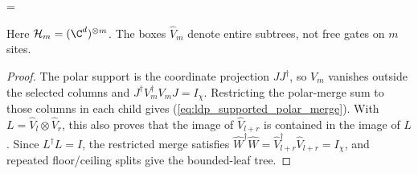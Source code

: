 \begin{lemma}
    \begin{center}
        \tenkzkernel
        \begin{tenkzequation}
            \begin{tenkz}[rows={wire}, cols=1, bonds=none]
            \end{tenkz}
            =
            \begin{tenkz}[rows={wire,wire}, cols=3, bonds=none]
            \end{tenkz}
        \end{tenkzequation}
    \end{center}
    Here $\mathcal H_m=(\C^d)^{\otimes m}$.
    The boxes $\widehat V_m$ denote entire subtrees, not free gates on $m$ sites.
\end{lemma}
\begin{proof}
    \leanok
    The polar support is the coordinate projection $JJ^\dagger$,
    so $V_m$ vanishes outside the selected columns and
    $J^\dagger V_m^\dagger V_mJ=I_\chi$.
    Restricting the polar-merge sum to those columns in each child gives
    (\ref{eq:ldp_supported_polar_merge}). With
    $L=\widehat V_l\otimes\widehat V_r$, this also proves that the
    image of $\widehat V_{l+r}$ is contained in the image of $L$.
    Since $L^\dagger L=I$, the restricted merge satisfies
    $\widehat W^\dagger\widehat W
        =\widehat V_{l+r}^\dagger\widehat V_{l+r}=I_\chi$, and
    repeated floor/ceiling splits give the bounded-leaf tree.
\end{proof}

